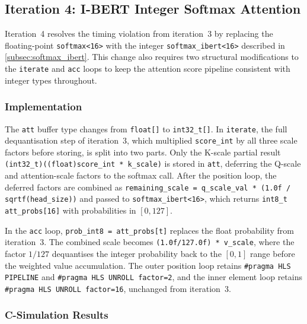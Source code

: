 \subsection{Iteration 4: I-BERT Integer Softmax Attention}
\label{subsec:attn_ibert}

Iteration~4 resolves the timing violation from iteration~3 by replacing the
floating-point \texttt{softmax<16>} with the integer \texttt{softmax\_ibert<16>}
described in \cref{subsec:softmax_ibert}. This change also requires two
structural modifications to the \texttt{iterate} and \texttt{acc} loops to
keep the attention score pipeline consistent with integer types throughout.

\subsubsection{Implementation}
\label{subsubsec:attn_ibert_impl}

The \texttt{att} buffer type changes from \texttt{float[]} to
\texttt{int32\_t[]}. In \texttt{iterate}, the full dequantisation step of
iteration~3, which multiplied \texttt{score\_int} by all three scale factors
before storing, is split into two parts. Only the K-scale partial result
\texttt{(int32\_t)((float)score\_int * k\_scale)} is stored in \texttt{att},
deferring the Q-scale and attention-scale factors to the softmax call. After
the position loop, the deferred factors are combined as \texttt{remaining\_scale
= q\_scale\_val * (1.0f / sqrtf(head\_size))} and passed to
\texttt{softmax\_ibert<16>}, which returns \texttt{int8\_t att\_probs[16]}
with probabilities in $[0, 127]$.

In the \texttt{acc} loop, \texttt{prob\_int8 = att\_probs[t]} replaces the
float probability from iteration~3. The combined scale becomes
\texttt{(1.0f/127.0f) * v\_scale}, where the factor $1/127$ dequantises the
integer probability back to the $[0, 1]$ range before the weighted value
accumulation. The outer position loop retains \texttt{\#pragma HLS PIPELINE}
and \texttt{\#pragma HLS UNROLL factor=2}, and the inner element loop retains
\texttt{\#pragma HLS UNROLL factor=16}, unchanged from iteration~3.

\subsubsection{C-Simulation Results}
\label{subsubsec:attn_ibert_csim}

